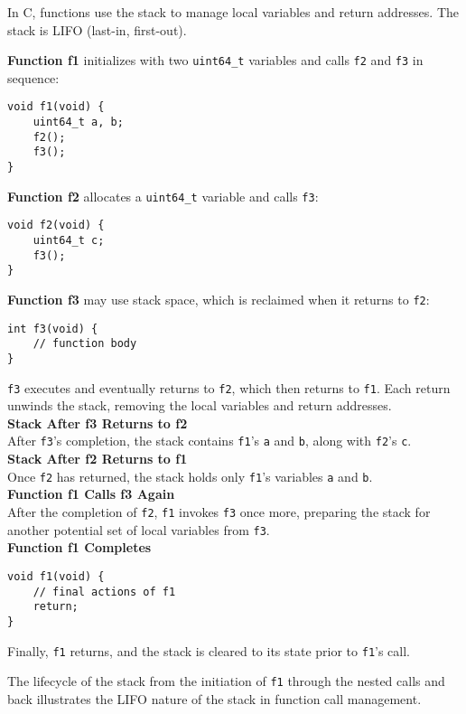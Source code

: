 \documentclass[12pt]{article}
\begin{document}
In C, functions use the stack to manage local variables and return addresses. The stack is LIFO (last-in, first-out). 

\textbf{Function f1} initializes with two \texttt{uint64\_t} variables and calls \texttt{f2} and \texttt{f3} in sequence:
\begin{lstlisting}
void f1(void) {
    uint64_t a, b;
    f2();
    f3();
}
\end{lstlisting}

\textbf{Function f2} allocates a \texttt{uint64\_t} variable and calls \texttt{f3}:
\begin{lstlisting}
void f2(void) {
    uint64_t c;
    f3();
}
\end{lstlisting}

\textbf{Function f3} may use stack space, which is reclaimed when it returns to \texttt{f2}:
\begin{lstlisting}
int f3(void) {
    // function body
}
\end{lstlisting}

\texttt{f3} executes and eventually returns to \texttt{f2}, which then returns to \texttt{f1}. Each return unwinds the stack, removing the local variables and return addresses.\\

\textbf{Stack After f3 Returns to f2}\\
After \texttt{f3}'s completion, the stack contains \texttt{f1}'s \texttt{a} and \texttt{b}, along with \texttt{f2}'s \texttt{c}.\\

\textbf{Stack After f2 Returns to f1}\\
Once \texttt{f2} has returned, the stack holds only \texttt{f1}'s variables \texttt{a} and \texttt{b}.\\

\textbf{Function f1 Calls f3 Again}\\
After the completion of \texttt{f2}, \texttt{f1} invokes \texttt{f3} once more, preparing the stack for another potential set of local variables from \texttt{f3}.\\

\textbf{Function f1 Completes}
\begin{lstlisting}
void f1(void) {
    // final actions of f1
    return;
}
\end{lstlisting}
Finally, \texttt{f1} returns, and the stack is cleared to its state prior to \texttt{f1}'s call.

The lifecycle of the stack from the initiation of \texttt{f1} through the nested calls and back illustrates the LIFO nature of the stack in function call management.
\end{document}
